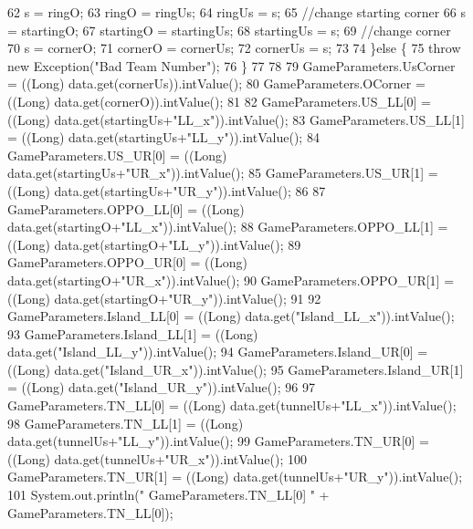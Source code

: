 \begin{DoxyCode}
62         s = ringO;
63         ringO = ringUs;
64         ringUs = s;
65         \textcolor{comment}{//change starting corner}
66         s = startingO;
67         startingO = startingUs;
68         startingUs = s;
69         \textcolor{comment}{//change corner}
70         s = cornerO;
71         cornerO = cornerUs;
72         cornerUs = s;
73         
74       \}\textcolor{keywordflow}{else} \{
75         \textcolor{keywordflow}{throw} \textcolor{keyword}{new} Exception(\textcolor{stringliteral}{"Bad Team Number"});
76       \}
77       
78       
79       GameParameters.UsCorner = ((Long) data.get(cornerUs)).intValue();
80       GameParameters.OCorner = ((Long) data.get(cornerO)).intValue();
81 
82       GameParameters.US\_LL[0] = ((Long) data.get(startingUs+\textcolor{stringliteral}{"LL\_x"})).intValue();
83       GameParameters.US\_LL[1] = ((Long) data.get(startingUs+\textcolor{stringliteral}{"LL\_y"})).intValue();
84       GameParameters.US\_UR[0] = ((Long) data.get(startingUs+\textcolor{stringliteral}{"UR\_x"})).intValue();
85       GameParameters.US\_UR[1] = ((Long) data.get(startingUs+\textcolor{stringliteral}{"UR\_y"})).intValue();
86 
87       GameParameters.OPPO\_LL[0] = ((Long) data.get(startingO+\textcolor{stringliteral}{"LL\_x"})).intValue();
88       GameParameters.OPPO\_LL[1] = ((Long) data.get(startingO+\textcolor{stringliteral}{"LL\_y"})).intValue();
89       GameParameters.OPPO\_UR[0] = ((Long) data.get(startingO+\textcolor{stringliteral}{"UR\_x"})).intValue();
90       GameParameters.OPPO\_UR[1] = ((Long) data.get(startingO+\textcolor{stringliteral}{"UR\_y"})).intValue();
91 
92       GameParameters.Island\_LL[0] = ((Long) data.get(\textcolor{stringliteral}{"Island\_LL\_x"})).intValue();
93       GameParameters.Island\_LL[1] = ((Long) data.get(\textcolor{stringliteral}{"Island\_LL\_y"})).intValue();
94       GameParameters.Island\_UR[0] = ((Long) data.get(\textcolor{stringliteral}{"Island\_UR\_x"})).intValue();
95       GameParameters.Island\_UR[1] = ((Long) data.get(\textcolor{stringliteral}{"Island\_UR\_y"})).intValue();
96 
97       GameParameters.TN\_LL[0] = ((Long) data.get(tunnelUs+\textcolor{stringliteral}{"LL\_x"})).intValue();
98       GameParameters.TN\_LL[1] = ((Long) data.get(tunnelUs+\textcolor{stringliteral}{"LL\_y"})).intValue();
99       GameParameters.TN\_UR[0] = ((Long) data.get(tunnelUs+\textcolor{stringliteral}{"UR\_x"})).intValue();
100       GameParameters.TN\_UR[1] = ((Long) data.get(tunnelUs+\textcolor{stringliteral}{"UR\_y"})).intValue();
101       System.out.println(\textcolor{stringliteral}{" GameParameters.TN\_LL[0] "} +  GameParameters.TN\_LL[0]);

\end{DoxyCode}
